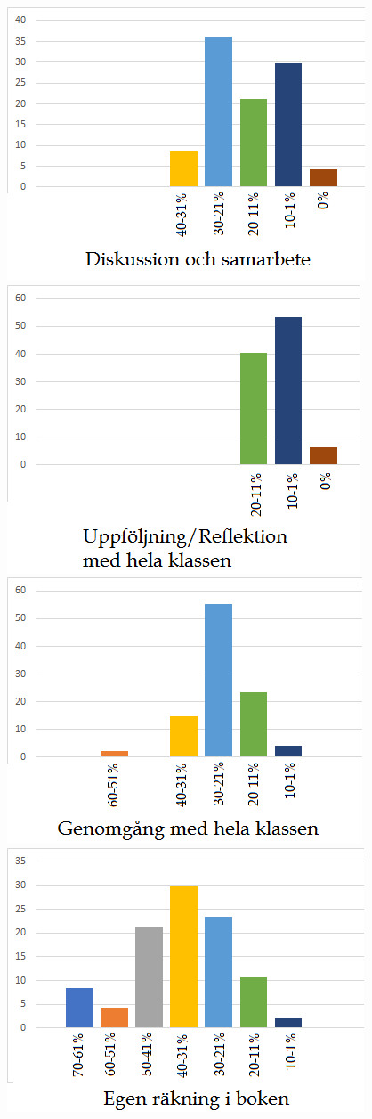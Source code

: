 \begin{figure}
    \includegraphics{Figures/Barcharts/diskussion.png}
    \includegraphics{Figures/Barcharts/uppfoljning.png}
    \includegraphics{Figures/Barcharts/genomgang.png}
    \includegraphics{Figures/Barcharts/rankning.png}

\end{figure}
